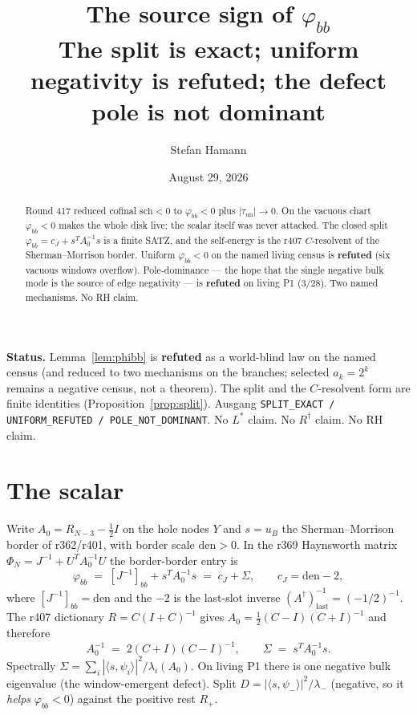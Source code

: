 \documentclass[11pt]{article}
\title{\bfseries The source sign of $\varphi_{bb}$\\[2mm]
\large The split is exact; uniform negativity is refuted;
the defect pole is not dominant}
\author{Stefan Hamann}
\date{August 29, 2026}
\theoremstyle{remark}
\newcommand{\phibb}{\varphi_{bb}}
\begin{document}
\maketitle

\begin{abstract}\noindent
Round 417 reduced cofinal $\mathrm{sch}<0$ to
$\phibb<0$ plus $|\tau_{\mathrm{un}}|\to 0$.
On the vacuous chart $\phibb<0$ makes the whole disk live;
the scalar itself was never attacked.
The closed split
$\phibb=c_J+s^{T}A_{0}^{-1}s$
is a finite SATZ, and the self-energy is the r407
$C$-resolvent of the Sherman--Morrison border.
Uniform $\phibb<0$ on the named living census is
\textbf{refuted} (six vacuous windows overflow).
Pole-dominance --- the hope that the single negative
bulk mode is the source of edge negativity --- is
\textbf{refuted} on living P1 ($3/28$).
Two named mechanisms.  No RH claim.
\end{abstract}

\medskip\noindent
\textbf{Status.}\enspace
Lemma~\ref{lem:phibb} is \textbf{refuted} as a world-blind
law on the named census (and reduced to two mechanisms
on the branches; selected $a_k=2^k$ remains a negative
census, not a theorem).
The split and the $C$-resolvent form are finite identities
(Proposition~\ref{prop:split}).
Ausgang \texttt{SPLIT\_EXACT / UNIFORM\_REFUTED / POLE\_NOT\_DOMINANT}.
No $L^{*}$ claim.  No $R^{\dagger}$ claim.  No RH claim.

\section{The scalar}\label{sec:obj}

Write $A_{0}=R_{N-3}-\tfrac12 I$ on the hole nodes $Y$
and $s=u_B$ the Sherman--Morrison border of r362/r401,
with border scale $\mathrm{den}>0$.
In the r369 Haynsworth matrix
$\Phi_N=J^{-1}+U^{T}A_{0}^{-1}U$ the border-border entry is
\begin{equation}\label{eq:split}
\phibb
\;=\;
[J^{-1}]_{bb}+s^{T}A_{0}^{-1}s
\;=\;
c_J+\Sigma,
\qquad
c_J=\mathrm{den}-2,
\end{equation}
where $[J^{-1}]_{bb}=\mathrm{den}$ and the $-2$ is the last-slot
inverse $(A^{\dagger})_{\mathrm{last}}^{-1}=(-1/2)^{-1}$.
The r407 dictionary
$R=C(I+C)^{-1}$ gives
$A_{0}=\tfrac12(C-I)(C+I)^{-1}$ and therefore
\begin{equation}\label{eq:Cres}
A_{0}^{-1}
\;=\;
2(C+I)(C-I)^{-1},
\qquad
\Sigma
\;=\;
s^{T}A_{0}^{-1}s.
\end{equation}
Spectrally $\Sigma=\sum_i|\langle s,\psi_i\rangle|^{2}/\lambda_i(A_{0})$.
On living P1 there is one negative bulk eigenvalue
(the window-emergent defect).  Split
$D=|\langle s,\psi_{-}\rangle|^{2}/\lambda_{-}$
(negative, so it \emph{helps} $\phibb<0$) against the
positive rest $R_{+}$.
\end{document}
